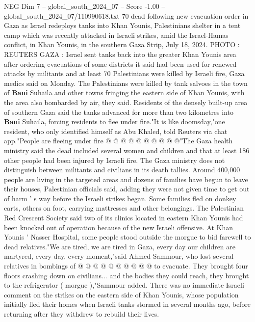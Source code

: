 \begin{textsample}{NEG Dim 7 – global\_south\_2024\_07 – Score -1.00 – global\_south\_2024\_07/110990618.txt}  \label{ex:f7_neg_350}
70 dead following new evacuation order in Gaza as Israel redeploys tanks into Khan Younis, Palestinians shelter in a tent camp which was recently attacked in Israeli strikes, amid the Israel-Hamas conflict, in Khan Younis, in the southern Gaza Strip, July 18, 2024.
PHOTO : REUTERS GAZA : Israel sent tanks back into the greater Khan Younis area after ordering evacuations of some districts it said had been used for renewed attacks by militants and at least 70 Palestinians were killed by Israeli fire, Gaza medics said on Monday.
The Palestinians were killed by tank salvoes in the town of \textbf{Bani} Suhaila and other towns fringing the eastern side of Khan Younis, with the area also bombarded by air, they said.
Residents of the densely built-up area of southern Gaza said the tanks advanced for more than two kilometres into \textbf{Bani} Suhaila, forcing residents to flee under fire."It is like doomsday,"one resident, who only identified himself as Abu Khaled, told Reuters via chat app."People are fleeing under fire @ @ @ @ @ @ @ @ @ @"The Gaza health ministry said the dead included several women and children and that at least 186 other people had been injured by Israeli fire.
The Gaza ministry does not distinguish between militants and civilians in its death tallies.
Around 400,000 people are living in the targeted areas and dozens of families have begun to leave their houses, Palestinian officials said, adding they were not given time to get out of harm ' s way before the Israeli strikes began.
Some families fled on donkey carts, others on foot, carrying mattresses and other belongings.
The Palestinian Red Crescent Society said two of its clinics located in eastern Khan Younis had been knocked out of operation because of the new Israeli offensive.
At Khan Younis ' Nasser Hospital, some people stood outside the morgue to bid farewell to dead relatives."We are tired, we are tired in Gaza, every day our children are martyred, every day, every moment,"said Ahmed Sammour, who lost several relatives in bombings of @ @ @ @ @ @ @ @ @ @ to evacuate.
They brought four floors crashing down on civilians... and the bodies they could reach, they brought to the refrigerator ( morgue ),"Sammour added.
There was no immediate Israeli comment on the strikes on the eastern side of Khan Younis, whose population initially fled their homes when Israeli tanks stormed in several months ago, before returning after they withdrew to rebuild their lives.

\end{textsample}
